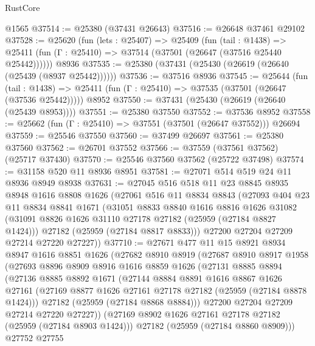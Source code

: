 \begin{lexlean}{RustCore}
\begin{coremodule}
    @1565
@37514 := @25380 (@37431 @26643)
@37516 := @26648 @37461 @29102
@37528 := @25620
    (fun (lets : @25407) =>
    @25409
      (fun (tail : @1438) =>
      @25411 (fun (Γ : @25410) => @37514 (@37501 (@26647 (@37516 @25440 @25442))))))
    @8936
@37535 := @25380 (@37431 (@25430 (@26619 (@26640 (@25439 (@8937 @25442))))))
@37536 := @37516 @8936
@37545 := @25644
    (fun (tail : @1438) => @25411 (fun (Γ : @25410) => @37535 (@37501 (@26647 (@37536 @25442)))))
    @8952
@37550 := @37431 (@25430 (@26619 (@26640 (@25439 @8953))))
@37551 := @25380 @37550
@37552 := @37536 @8952
@37558 := @25662 (fun (Γ : @25410) => @37551 (@37501 (@26647 @37552))) @26694
@37559 := @25546 @37550
@37560 := @37499 @26697
@37561 := @25380 @37560
@37562 := @26701 @37552
@37566 := @37559 (@37561 @37562) (@25717 @37430)
@37570 := @25546 @37560 @37562 (@25722 @37498)
@37574 := @31158 @520 @11 @8936 @8951
@37581 := @27071 @514 @519 @24 @11 @8936 @8949 @8938
@37631 := @27045
    @516
    @518
    @11
    @23
    @8845
    @8935
    @8948
    @1616
    @8808
    @1626
    (@27061
      @516
      @11
      @8834
      @8843
      (@27093
        @404
        @23
        @11
        @8834
        @8841
        @1671
        (@31051
          @8833
          @8840
          @1616
          @8816
          @1626
          @31082
          (@31091 @8826 @1626 @31110 @27178 @27182 (@25959 (@27184 @8827 @1424)))
          @27182
          (@25959 (@27184 @8817 @8833)))
        @27200
        @27204
        @27209
        @27214
        @27220
        @27227))
@37710 := @27671
    @477
    @11
    @15
    @8921
    @8934
    @8947
    @1616
    @8851
    @1626
    (@27682
      @8910
      @8919
      (@27687
        @8910
        @8917
        @1958
        (@27693
          @8896
          @8909
          @8916
          @1616
          @8859
          @1626
          (@27131
            @8885
            @8894
            (@27136
              @8885
              @8892
              @1671
              (@27144
                @8884
                @8891
                @1616
                @8867
                @1626
                @27161
                (@27169 @8877 @1626 @27161 @27178 @27182 (@25959 (@27184 @8878 @1424)))
                @27182
                (@25959 (@27184 @8868 @8884)))
              @27200
              @27204
              @27209
              @27214
              @27220
              @27227))
          (@27169 @8902 @1626 @27161 @27178 @27182 (@25959 (@27184 @8903 @1424)))
          @27182
          (@25959 (@27184 @8860 @8909)))
        @27752
        @27755

\end{coremodule}
\end{lexlean}
